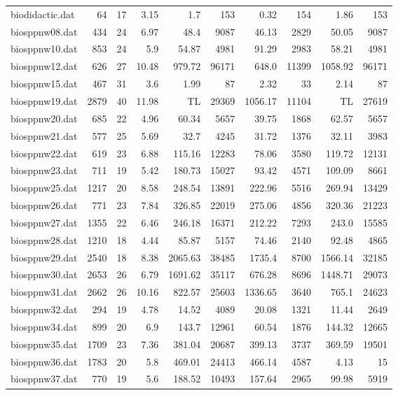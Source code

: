 \begin{center}
\begin{scriptsize}
\begin{longtable}{lrrrrrrrrr}
biodidactic.dat & 64 & 17 & 3.15 & 1.7 & 153 & 0.32 & 154 & 1.86 & 153\\
biosppnw08.dat & 434 & 24 & 6.97 & 48.4 & 9087 & 46.13 & 2829 & 50.05 & 9087\\
biosppnw10.dat & 853 & 24 & 5.9 & 54.87 & 4981 & 91.29 & 2983 & 58.21 & 4981\\
biosppnw12.dat & 626 & 27 & 10.48 & 979.72 & 96171 & 648.0 & 11399 & 1058.92 & 96171\\
biosppnw15.dat & 467 & 31 & 3.6 & 1.99 & 87 & 2.32 & 33 & 2.14 & 87\\
biosppnw19.dat & 2879 & 40 & 11.98 &  TL & 29369 & 1056.17 & 11104 &  TL & 27619\\
biosppnw20.dat & 685 & 22 & 4.96 & 60.34 & 5657 & 39.75 & 1868 & 62.57 & 5657\\
biosppnw21.dat & 577 & 25 & 5.69 & 32.7 & 4245 & 31.72 & 1376 & 32.11 & 3983\\
biosppnw22.dat & 619 & 23 & 6.88 & 115.16 & 12283 & 78.06 & 3580 & 119.72 & 12131\\
biosppnw23.dat & 711 & 19 & 5.42 & 180.73 & 15027 & 93.42 & 4571 & 109.09 & 8661\\
biosppnw25.dat & 1217 & 20 & 8.58 & 248.54 & 13891 & 222.96 & 5516 & 269.94 & 13429\\
biosppnw26.dat & 771 & 23 & 7.84 & 326.85 & 22019 & 275.06 & 4856 & 320.36 & 21223\\
biosppnw27.dat & 1355 & 22 & 6.46 & 246.18 & 16371 & 212.22 & 7293 & 243.0 & 15585\\
biosppnw28.dat & 1210 & 18 & 4.44 & 85.87 & 5157 & 74.46 & 2140 & 92.48 & 4865\\
biosppnw29.dat & 2540 & 18 & 8.38 & 2065.63 & 38485 & 1735.4 & 8700 & 1566.14 & 32185\\
biosppnw30.dat & 2653 & 26 & 6.79 & 1691.62 & 35117 & 676.28 & 8696 & 1448.71 & 29073\\
biosppnw31.dat & 2662 & 26 & 10.16 & 822.57 & 25603 & 1336.65 & 3640 & 765.1 & 24623\\
biosppnw32.dat & 294 & 19 & 4.78 & 14.52 & 4089 & 20.08 & 1321 & 11.44 & 2649\\
biosppnw34.dat & 899 & 20 & 6.9 & 143.7 & 12961 & 60.54 & 1876 & 144.32 & 12665\\
biosppnw35.dat & 1709 & 23 & 7.36 & 381.04 & 20687 & 399.13 & 3737 & 369.59 & 19501\\
biosppnw36.dat & 1783 & 20 & 5.8 & 469.01 & 24413 & 466.14 & 4587 & 4.13 & 15\\
biosppnw37.dat & 770 & 19 & 5.6 & 188.52 & 10493 & 157.64 & 2965 & 99.98 & 5919\\

\end{longtable}
\end{scriptsize}
\end{center}
